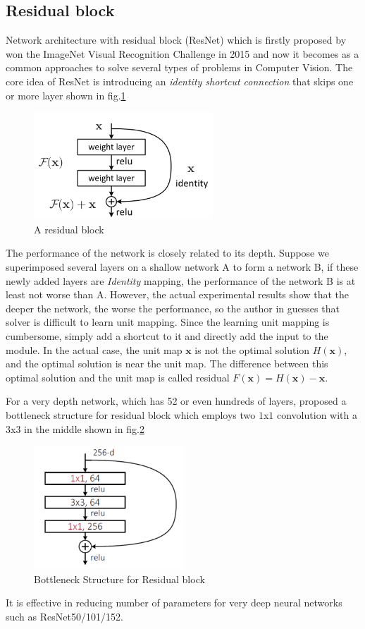 \subsection{Residual block}
\hspace{0.5cm} Network architecture with residual block (ResNet) which is firstly proposed by \cite{He_2016_CVPR} won the ImageNet Visual Recognition Challenge in 2015 and now it becomes as a common approaches to solve several types of problems in Computer Vision. The core idea of ResNet is introducing an \textit{identity shortcut connection} that skips one or more layer shown in fig.\ref{fig:res_block}
\begin{figure}[h!]
    \centering
    \includegraphics[width=0.6\textwidth]{Chapters/Fig/res_block.png}
    \caption{A residual block}
    \label{fig:res_block}
\end{figure}\par
 The performance of the network is closely related to its depth. Suppose we superimposed several layers on a shallow network A to form a network B, if these newly added layers are \textit{Identity} mapping, the performance of the network B is at least not worse than A. However, the actual experimental results show that the deeper the network, the worse the performance\cite{He_2016_CVPR}, so the author in \cite{He_2016_CVPR} guesses that solver is difficult to learn unit mapping. Since the learning unit mapping is cumbersome, simply add a shortcut to it and directly add the input to the module. In the actual case, the unit map $\pmb{x}$ is not the optimal solution $H(\pmb{x})$, and the optimal solution is near the unit map. The difference between this optimal solution and the unit map is called residual $F(\pmb{x}) = H(\pmb{x}) - \pmb{x}$.\par
 For a very depth network, which has 52 or even hundreds of layers, \cite{He_2016_CVPR} proposed a bottleneck structure for residual block which employs two $1$x$1$ convolution with a $3$x$3$ in the middle shown in fig.\ref{fig:b_res}
 \begin{figure}
     \centering
     \includegraphics[width=0.5\textwidth]{Chapters/Fig/bottle_neck_residual.PNG}
     \caption{Bottleneck Structure for Residual block}
     \label{fig:b_res}
 \end{figure}
 \par It is effective in reducing number of parameters for very deep neural networks such as ResNet50/101/152.

\pagebreak